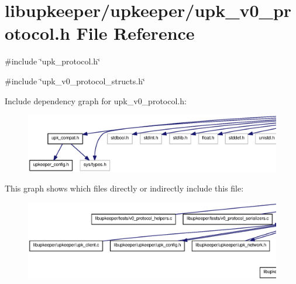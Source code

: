 \section{libupkeeper/upkeeper/upk\_\-v0\_\-protocol.h File Reference}
\label{upk__v0__protocol_8h}
{\ttfamily \#include \char`\"{}upk\_\-protocol.h\char`\"{}}\par
{\ttfamily \#include \char`\"{}upk\_\-v0\_\-protocol\_\-structs.h\char`\"{}}\par
Include dependency graph for upk\_\-v0\_\-protocol.h:\nopagebreak
\begin{figure}[H]
\begin{center}
\leavevmode
\includegraphics[width=400pt]{upk__v0__protocol_8h__incl}
\end{center}
\end{figure}
This graph shows which files directly or indirectly include this file:
\nopagebreak
\begin{figure}[H]
\begin{center}
\leavevmode
\includegraphics[width=400pt]{upk__v0__protocol_8h__dep__incl}
\end{center}
\end{figure}
